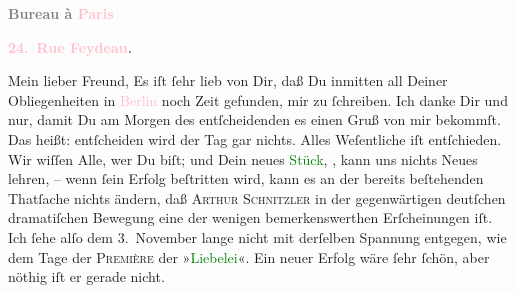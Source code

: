            \begin{otherlanguage}{french}\textcolor{gray}{\textbf{\textbf{Bureau à \textcolor{pink}{Paris}{}\ledrightnote{\textcolor{pink}{Paris}}}}}\end{otherlanguage}\pend
           \pstart
           \begin{otherlanguage}{french}\textcolor{gray}{\textbf{\textbf{\textcolor{pink}{24. Rue Feydeau}{}\ledrightnote{\textcolor{pink}{rue Feydeau}}.}}}\end{otherlanguage}\pend
           \pstart{}Mein lieber Freund,\pend\pstart
           Es iſt ſehr lieb von Dir, daß Du inmitten all Deiner Obliegenheiten in \textcolor{pink}{Berlin}{}\ledrightnote{\textcolor{pink}{Berlin}} noch Zeit gefunden, mir zu ſchreiben. Ich
               danke Dir und \label{K_L02789-11v}\label{K_L02789-11h} nur,
               damit Du am Morgen des entſcheidenden \label{K_L02789-1v}\label{K_L02789-1h}es einen Gruß von mir bekommſt. Das heißt: entſcheiden wird der Tag gar nichts. Alles Weſentliche iſt entſchieden. Wir
               wiſſen Alle, wer Du biſt; und Dein neues \textcolor{green}{Stück}{}, \label{K_L02789-2v}\label{K_L02789-2h}, kann uns {\pb}nichts Neues lehren, – wenn \strikeout{\textcolor{gray}{ſ}} ſein Erfolg beſtritten wird, kann es an der bereits beſtehenden Thatſache
               nichts ändern, daß \textsc{Arthur Schnitzler} in der gegenwärtigen
               deutſchen dramatiſchen Bewegung eine der wenigen bemerkenswerthen Erſcheinungen iſt.
               Ich ſehe alſo dem 3. November lange nicht mit
               derſelben Spannung entgegen, wie dem Tage der \textsc{Première} der »\textcolor{green}{Liebelei}{}\ledrightnote{\textcolor{green}{Liebelei. Schauspiel in drei Akten}}«. Ein neuer Erfolg wäre ſehr ſchön, aber nöthig iſt er gerade nicht.
